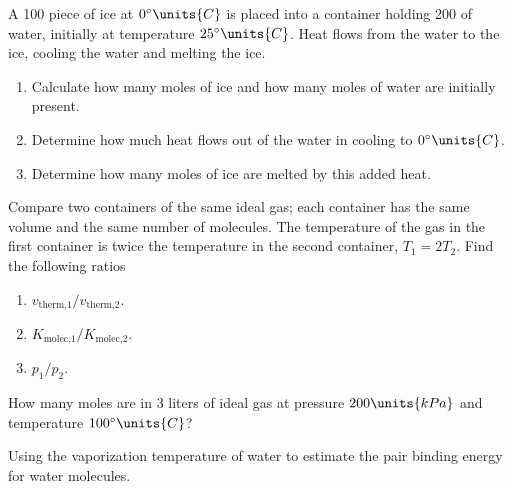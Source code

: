 \begin{problem}
A 100 piece of ice at $0^\circ\units{C}$ is placed into a
container holding 200 of water, initially at temperature
$25^\circ\units{C}$.  Heat flows from the water to the ice, cooling the water
and melting the ice. 
\begin{enumerate}
\item Calculate how many moles of ice and how many moles of water are
initially present.
\item  Determine how much 
heat flows out of the water in cooling to  $0^\circ\units{C}$.
\item Determine how many moles of ice are melted by this added heat.
\end{enumerate}
\label{problem:water_calorimetry}
\end{problem}

\begin{problem}
Compare two containers of the same ideal gas; each container has 
the same volume and the same number of molecules.  The temperature 
of the gas in the first container is twice the temperature in the 
second container,
$T_1=2T_2$.  Find the following ratios
\begin{enumerate}
\item $v_\text{therm,1}/v_\text{therm,2}$.
\item $K_\text{molec,1}/K_\text{molec,2}$.
\item $p_1/p_2$.
\end{enumerate}
\label{problem:ideal_gas_ratios}
\end{problem}

\begin{problem}
How many moles are in 3 liters of ideal gas at pressure $200\units{kPa}$
and temperature $100^\circ\units{C}$?
\label{problem:ideal_gas_moles}
\end{problem}

\begin{problem} 
  Using the vaporization temperature of water to estimate the pair
  binding energy for water molecules.
\label{problem:heat_of_vaporization}
\end{problem}


